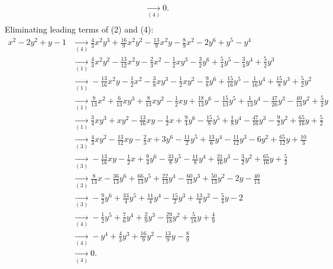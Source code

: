 {\begin{align*}
\\ &\underset{(4)}{\rightarrow}0
.\\ \end{align*}
Eliminating leading terms of (2) and (4):
\begin{align*}
x^{2}-2y^{2}+y-1&\underset{(4)}{\rightarrow}\frac{4}{3}x^{2}y^{3}+\frac{16}{9}x^{2}y^{2}-\frac{13}{9}x^{2}y-\frac{8}{9}x^{2}-2y^{6}+y^{5}-y^{4}
\\ &\underset{(1)}{\rightarrow}\frac{4}{3}x^{2}y^{2}-\frac{13}{12}x^{2}y-\frac{2}{3}x^{2}-\frac{1}{2}xy^{3}-\frac{3}{2}y^{6}+\frac{5}{4}y^{5}-\frac{3}{4}y^{4}+\frac{5}{2}y^{3}
\\ &\underset{(1)}{\rightarrow}-\frac{13}{16}x^{2}y-\frac{1}{2}x^{2}-\frac{3}{8}xy^{3}-\frac{1}{2}xy^{2}-\frac{9}{8}y^{6}+\frac{15}{16}y^{5}-\frac{1}{16}y^{4}+\frac{15}{8}y^{3}+\frac{5}{2}y^{2}
\\ &\underset{(1)}{\rightarrow}\frac{8}{13}x^{2}+\frac{6}{13}xy^{3}+\frac{8}{13}xy^{2}-\frac{1}{2}xy+\frac{18}{13}y^{6}-\frac{15}{13}y^{5}+\frac{1}{13}y^{4}-\frac{47}{26}y^{3}-\frac{40}{13}y^{2}+\frac{5}{2}y
\\ &\underset{(1)}{\rightarrow}\frac{3}{4}xy^{3}+xy^{2}-\frac{13}{16}xy-\frac{1}{2}x+\frac{9}{4}y^{6}-\frac{15}{8}y^{5}+\frac{1}{8}y^{4}-\frac{47}{16}y^{3}-\frac{9}{2}y^{2}+\frac{65}{16}y+\frac{5}{2}
\\ &\underset{(3)}{\rightarrow}\frac{4}{3}xy^{2}-\frac{13}{12}xy-\frac{2}{3}x+3y^{6}-\frac{11}{2}y^{5}+\frac{13}{6}y^{4}-\frac{11}{12}y^{3}-6y^{2}+\frac{65}{12}y+\frac{10}{3}
\\ &\underset{(3)}{\rightarrow}-\frac{13}{16}xy-\frac{1}{2}x+\frac{9}{4}y^{6}-\frac{33}{8}y^{5}-\frac{11}{8}y^{4}+\frac{21}{16}y^{3}-\frac{3}{2}y^{2}+\frac{65}{16}y+\frac{5}{2}
\\ &\underset{(3)}{\rightarrow}\frac{8}{13}x-\frac{36}{13}y^{6}+\frac{66}{13}y^{5}+\frac{22}{13}y^{4}-\frac{60}{13}y^{3}+\frac{50}{13}y^{2}-2y-\frac{40}{13}
\\ &\underset{(3)}{\rightarrow}-\frac{9}{2}y^{6}+\frac{33}{4}y^{5}+\frac{11}{4}y^{4}-\frac{15}{2}y^{3}+\frac{13}{4}y^{2}-\frac{5}{4}y-2
\\ &\underset{(4)}{\rightarrow}-\frac{1}{2}y^{5}+\frac{7}{6}y^{4}+\frac{2}{9}y^{3}-\frac{29}{18}y^{2}+\frac{5}{18}y+\frac{4}{9}
\\ &\underset{(4)}{\rightarrow}-y^{4}+\frac{4}{3}y^{3}+\frac{16}{9}y^{2}-\frac{13}{9}y-\frac{8}{9}
\\ &\underset{(4)}{\rightarrow}0
.\\ \end{align*}
}
